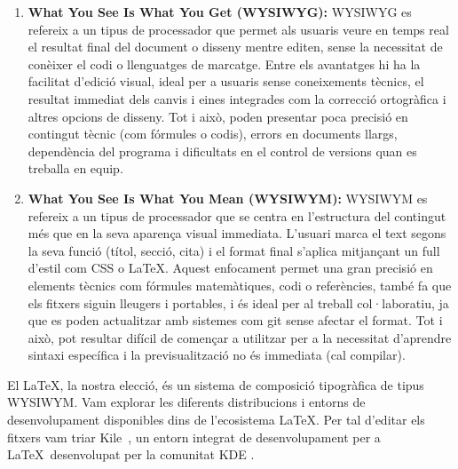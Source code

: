  \begin{enumerate}
  \item \textbf{What You See Is What You Get (WYSIWYG): } WYSIWYG es refereix a un tipus de processador que permet als usuaris veure en temps real el resultat final del document o disseny mentre editen, sense la necessitat de conèixer el codi o llenguatges de marcatge.
    Entre els avantatges hi ha la facilitat d'edició visual, ideal per a usuaris sense coneixements tècnics, el resultat immediat dels canvis i eines integrades com la correcció ortogràfica i altres opcions de disseny. Tot i això, poden presentar poca precisió en contingut tècnic (com fórmules o codis), errors en documents llargs, dependència del programa i dificultats en el control de versions quan es treballa en equip.

    \item \textbf{What You See Is What You Mean (WYSIWYM): } WYSIWYM es refereix a un tipus de processador que se centra en l'estructura del contingut més que en la seva aparença visual immediata. L'usuari marca el text segons la seva funció (títol, secció, cita) i el format final s'aplica mitjançant un full d'estil com CSS o LaTeX. Aquest enfocament permet una gran precisió en elements tècnics com fórmules matemàtiques, codi o referències, també fa que els fitxers siguin lleugers i portables, i és ideal per al treball col·laboratiu, ja que es poden actualitzar amb sistemes com git sense afectar el format. Tot i això, pot resultar difícil de començar a utilitzar per a la necessitat d'aprendre sintaxi específica i la previsualització no és immediata (cal compilar).%
\end{enumerate}

El \LaTeX, la nostra elecció, és un sistema de composició tipogràfica de tipus WYSIWYM. Vam explorar les diferents distribucions i entorns de desenvolupament disponibles dins de l’ecosistema \LaTeX. Per tal d'editar els fitxers vam triar Kile~\cite{Kile}, un entorn integrat de desenvolupament per a \LaTeX~desenvolupat per la comunitat KDE \cite{KDE}.\\

